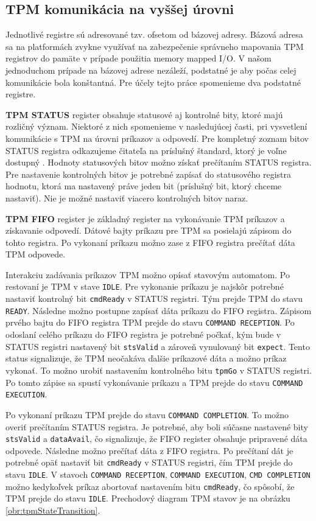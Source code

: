 \subsection{TPM komunikácia na vyššej úrovni}
Jednotlivé registre sú adresované tzv. ofsetom od bázovej adresy. Bázová adresa sa na platformách zvykne využívať na zabezpečenie správneho mapovania TPM registrov do pamäte v prípade použitia memory mapped I/O. V našom jednoduchom prípade na bázovej adrese nezáleží, podstatné je aby počas celej komunikácie bola konštantná. Pre účely tejto práce spomenieme dva podstatné registre.

\textbf{TPM STATUS} register obsahuje statusové aj kontrolné bity, ktoré majú rozličný význam. Niektoré z nich spomenieme v nasledujúcej časti, pri vysvetlení komunikácie s TPM na úrovni príkazov a odpovedí. Pre kompletný zoznam bitov STATUS registra odkazujeme čitateľa na príslušný štandard, ktorý je voľne dostupný \cite{tpmTis}. Hodnoty statusových bitov možno získať prečítaním STATUS registra. Pre nastavenie kontrolných bitov je potrebné zapísať do statusového registra hodnotu, ktorá ma nastavený práve jeden bit (príslušný bit, ktorý chceme nastaviť). Nie je možné nastaviť viacero kontrolných bitov naraz.

\textbf{TPM FIFO} register je základný register na vykonávanie TPM príkazov a získavanie odpovedí. Dátové bajty príkazu pre TPM sa posielajú zápisom do tohto registra. Po vykonaní príkazu možno zase z FIFO registra prečítať dáta TPM odpovede.

Interakciu zadávania príkazov TPM možno opísať stavovým automatom. Po restovaní je TPM v stave \texttt{IDLE}. Pre vykonanie príkazu je najskôr potrebné nastaviť kontrolný bit \texttt{cmdReady} v STATUS registri. Tým prejde TPM do stavu \texttt{READY}. Následne možno postupne zapísať dáta príkazu do FIFO registra. Zápisom prvého bajtu do FIFO registra TPM prejde do stavu \texttt{COMMAND RECEPTION}. Po odoslaní celého príkazu do FIFO registra je potrebné počkať, kým bude v STATUS registri nastavený bit \texttt{stsValid} a zároveň vynulovaný bit \texttt{expect}. Tento status signalizuje, že TPM neočakáva ďalšie príkazové dáta a možno príkaz vykonať. To možno urobiť nastavením kontrolného bitu \texttt{tpmGo} v STATUS registri. Po tomto zápise sa spustí vykonávanie príkazu a TPM prejde do stavu \texttt{COMMAND EXECUTION}.

Po vykonaní príkazu TPM prejde do stavu \texttt{COMMAND COMPLETION}. To možno overiť prečítaním STATUS registra. Je potrebné, aby boli súčasne nastavené bity \texttt{stsValid} a \texttt{dataAvail}, čo signalizuje, že FIFO register obsahuje pripravené dáta odpovede. Následne možno prečítať dáta z FIFO registra. Po prečítaní dát je potrebné opäť nastaviť  bit \texttt{cmdReady} v STATUS registri, čím TPM prejde do stavu \texttt{IDLE}. V stavoch \texttt{COMMAND RECEPTION}, \texttt{COMMAND EXECUTION}, \texttt{CMD COMPLETION} možno kedykoľvek príkaz abortovať nastavením bitu \texttt{cmdReady}, čo spôsobí, že TPM prejde do stavu \texttt{IDLE}. Prechodový diagram TPM stavov je na obrázku \ref{obr:tpmStateTransition}.

